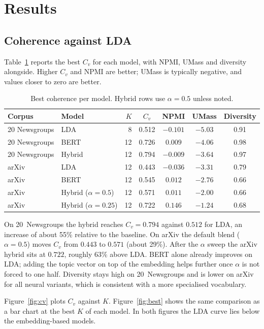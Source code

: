 \documentclass[11pt,a4paper]{article}
\begin{document}
\section{Results}
\label{sec:results}

\subsection{Coherence against LDA}
Table~\ref{tab:cv} reports the best $C_v$ for each model, with NPMI, UMass and diversity alongside. Higher $C_v$ and NPMI are better; UMass is typically negative, and values closer to zero are better.

\begin{table}[htbp]
\centering
\caption{Best coherence per model. Hybrid rows use $\alpha=0.5$ unless noted.}
\label{tab:cv}
\small
\begin{tabular}{@{}llrcccc@{}}
\toprule
Corpus & Model & $K$ & $C_v$ & NPMI & UMass & Diversity \\
\midrule
20 Newsgroups & LDA & 8 & 0.512 & $-0.101$ & $-5.03$ & 0.91 \\
20 Newsgroups & BERT & 12 & 0.726 & $0.009$ & $-4.06$ & 0.98 \\
20 Newsgroups & Hybrid & 12 & 0.794 & $-0.009$ & $-3.64$ & 0.97 \\
\midrule
arXiv & LDA & 12 & 0.443 & $-0.036$ & $-3.31$ & 0.79 \\
arXiv & BERT & 12 & 0.545 & $0.012$ & $-2.76$ & 0.66 \\
arXiv & Hybrid ($\alpha=0.5$) & 12 & 0.571 & $0.011$ & $-2.00$ & 0.66 \\
arXiv & Hybrid ($\alpha=0.25$) & 12 & 0.722 & $0.146$ & $-1.24$ & 0.68 \\
\bottomrule
\end{tabular}
\end{table}

On 20~Newsgroups the hybrid reaches $C_v=0.794$ against $0.512$ for LDA, an increase of about 55\% relative to the baseline. On arXiv the default blend ($\alpha=0.5$) moves $C_v$ from $0.443$ to $0.571$ (about 29\%). After the $\alpha$ sweep the arXiv hybrid sits at $0.722$, roughly 63\% above LDA. BERT alone already improves on LDA; adding the topic vector on top of the embedding helps further once $\alpha$ is not forced to one half. Diversity stays high on 20~Newsgroups and is lower on arXiv for all neural variants, which is consistent with a more specialised vocabulary.

Figure~\ref{fig:cv} plots $C_v$ against $K$. Figure~\ref{fig:best} shows the same comparison as a bar chart at the best $K$ of each model. In both figures the LDA curve lies below the embedding-based models.
\end{document}
